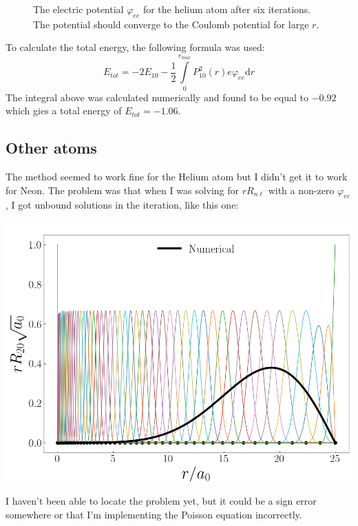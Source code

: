 \documentclass[twocolumn]{article}
\begin{document}
\begin{large}
\begin{figure}[h]
    \caption{The electric potential $\varphi_{ee}$ for the helium atom after six iterations. The potential should converge to the Coulomb potential for large $r$.}
    \label{5maj0822}
\end{figure}
To calculate the total energy, the following formula was used:
\begin{equation}
    E_{tot} = -2E_{10} - \frac{1}{2}\int\limits_0^{r_{max}}P_{10}^2(r)e\varphi_{ee}\text{d}r
\end{equation}
The integral above was calculated numerically and found to be equal to $-0.92$ which gies a total energy of $E_{tot}=-1.06$. 

\subsection*{Other atoms}
The method seemed to work fine for the Helium atom but I didn't get it to work for Neon. The problem was that when I was solving for $rR_{n\ell}$ with a non-zero $\varphi_{ee}$, I got unbound solutions in the iteration, like this one:
\begin{center}
    \includegraphics[scale=0.35]{neon.png}
\end{center}
I haven't been able to locate the problem yet, but it could be a sign error somewhere or that I'm implementing the Poisson equation incorrectly.



\end{large}
\end{document}
